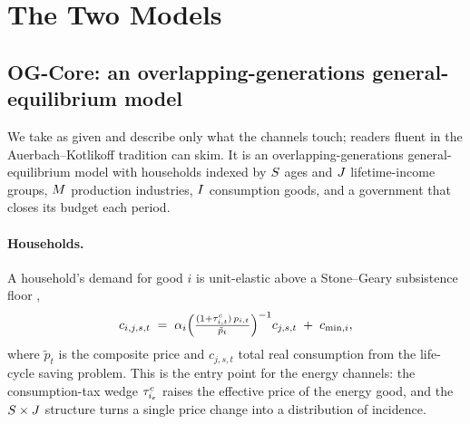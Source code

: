 \section{The Two Models}
\label{sec:models}

\subsection{OG-Core: an overlapping-generations general-equilibrium model}
\label{sec:og}

We take \OGCore{} \citep{debacker_evans_ogcore} as given and describe only what the
channels touch; readers fluent in the Auerbach--Kotlikoff tradition
\citep{auerbach_kotlikoff_1987} can skim. It is an overlapping-generations
general-equilibrium model with households indexed by $S$ ages and $J$
lifetime-income groups, $M$ production industries, $I$ consumption goods, and a
government that closes its budget each period.

\paragraph{Households.}
A household's demand for good $i$ is unit-elastic above a Stone--Geary subsistence floor
\citep{stone_1954},
\begin{equation}
  c_{i,j,s,t} \;=\; \alpha_i\Bigl(\tfrac{(1+\tau^{c}_{i,t})\,p_{i,t}}{\tilde p_t}\Bigr)^{-1}
                    c_{j,s,t} \;+\; c_{\min,i},
  \label{eq:hhdemand}
\end{equation}
where $\tilde p_t$ is the composite price and $c_{j,s,t}$ total real consumption from the
life-cycle saving problem. This is the entry point for the energy channels: the
consumption-tax wedge $\tau^{c}_{i_e}$ raises the effective price of the energy good, and the
$S\times J$ structure turns a single price change into a distribution of incidence.

